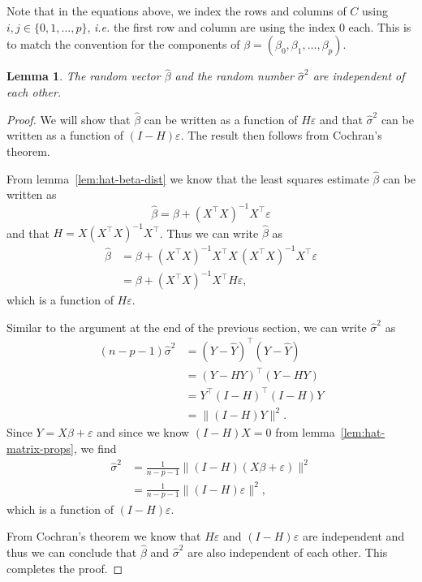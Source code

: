 \documentclass[
  a4paper,
]{article}
\newtheorem{lemma}{Lemma}[section]
\theoremstyle{definition}
\theoremstyle{definition}
\theoremstyle{definition}
\theoremstyle{definition}
\theoremstyle{remark}
\begin{document}
Note that in the equations above, we index the rows and columns of \(C\)
using \(i,j\in \{0, 1, \ldots, p\}\), \emph{i.e.} the first row and column are
using the index 0 each. This is to match the convention for the
components of \(\beta = (\beta_0, \beta_1, \ldots, \beta_p)\).

\begin{lemma}
\protect\hypertarget{lem:hat-beta-sigma-indep}{}\label{lem:hat-beta-sigma-indep}The random vector \(\hat\beta\) and the random number
\(\hat\sigma^2\) are independent of each other.
\end{lemma}

\begin{proof}
We will show that \(\hat\beta\) can be written as a function of \(H\varepsilon\)
and that \(\hat\sigma^2\) can be written as a function of \((I-H)\varepsilon\).
The result then follows from Cochran's theorem.

From lemma~\ref{lem:hat-beta-dist}
we know that the least squares estimate \(\hat\beta\) can be written as
\begin{equation*}
  \hat\beta
  = \beta + (X^\top X)^{-1} X^\top \varepsilon
\end{equation*}
and that \(H = X (X^\top X)^{-1} X^\top\). Thus we can write \(\hat\beta\) as
\begin{align*}
  \hat\beta
  &= \beta + (X^\top X)^{-1} X^\top X \, (X^\top X)^{-1} X^\top \varepsilon\\
  &= \beta + (X^\top X)^{-1} X^\top H \varepsilon,
\end{align*}
which is a function of \(H\varepsilon\).

Similar to the argument at the end of the previous section, we can
write \(\hat\sigma^2\) as
\begin{align*}
  (n - p - 1) \hat\sigma^2
  &= (Y - \hat Y)^\top (Y - \hat Y) \\
  &= (Y - H Y)^\top (Y - H Y) \\
  &= Y^\top (I - H)^\top (I - H) Y \\
  &= \bigl\| (I - H) Y \|^2.
\end{align*}
Since \(Y = X\beta + \varepsilon\) and since we know \((I-H)X = 0\) from
lemma~\ref{lem:hat-matrix-props}, we find
\begin{align*}
  \hat\sigma^2
  &= \frac{1}{n-p-1} \bigl\| (I - H) (X\beta + \varepsilon) \|^2 \\
  &= \frac{1}{n-p-1} \bigl\| (I - H) \varepsilon\|^2,
\end{align*}
which is a function of \((I - H)\varepsilon\).

From Cochran's theorem we know that \(H \varepsilon\) and \((I-H)\varepsilon\) are independent
and thus we can conclude that \(\hat\beta\) and \(\hat\sigma^2\) are also
independent of each other. This completes the proof.
\end{proof}
\end{document}

